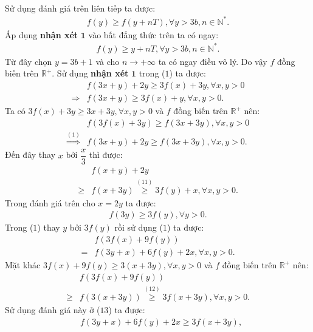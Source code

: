 \begin{multicols}{2}
\begin{align*}
	\end{align*}
	Sử dụng đánh giá trên liên tiếp ta được: 
	\begin{align*}
		f(y) \ge f(y + nT),\forall y > 3b,n \in \mathbb{N^*}.
	\end{align*}
	Áp dụng \textbf{\color{hoccungpi}nhận xét} $\pmb1$ vào bất đẳng thức trên ta có ngay:
	\begin{align*}
		f(y) \ge y + nT,\forall y > 3b,n \in \mathbb{N^*}.
	\end{align*}
	Từ đây chọn $y =3b + 1$ và cho $n \to + \infty$  ta có ngay điều vô lý. Do vậy $f$  đồng biến trên  $\mathbb{R^+}$.
	\vskip 0.1cm
	Sử dụng \textbf{\color{hoccungpi}nhận xét} $\pmb1$ trong ($1$) ta được: 
	\begin{align*}
		&f(3x + y) + 2y \ge 3f(x) + 3y,\forall x,y > 0\\
		\Rightarrow &f(3x + y) \ge 3f(x) + y,\forall x,y > 0. \tag{$11$}
	\end{align*}
	Ta có $3f(x) + 3y \ge 3x + 3y,\forall x,y > 0$  và $f$  đồng biến trên $\mathbb{R^+}$  nên:
	\begin{align*}
		&f(3f(x) + 3y) \ge f(3x + 3y),\forall x,y > 0\\
		\mathop  \Rightarrow \limits^{(1)} &f(3x + y) + 2y \ge f(3x + 3y),\forall x,y > 0.
	\end{align*}
	Đến đây thay $x$ bởi $\dfrac{x}{3}$  thì được: 
	\begin{align*}
		&f(x + y) + 2y \\
		\ge &f(x + 3y)\mathop  \ge \limits^{(11)} 3f(y) + x,\forall x,y > 0.
	\end{align*}
	Trong đánh giá trên cho $x = 2y$  ta được:
	\begin{align*}
		f(3y) \ge 3f(y),\forall y > 0. \tag{$12$}
	\end{align*}
	Trong ($1$) thay  $y$ bởi $3f(y)$  rồi sử dụng ($1$) ta được:   
	\begin{align*}
		&f(3f(x) + 9f(y)) \\
		= &f(3y + x) + 6f(y) + 2x,\forall x,y > 0. \tag{$13$}
	\end{align*}
	Mặt khác $3f(x) + 9f(y) \ge 3(x + 3y),\forall x,y > 0$  và $f$  đồng biến trên $\mathbb{R^+}$   nên: 
	\begin{align*}
		&f(3f(x) + 9f(y)) \\
		\ge & f(3(x + 3y))\mathop  \ge \limits^{(12)} 3f(x + 3y),\forall x,y > 0.
	\end{align*}
	Sử dụng đánh giá này ở ($13$)  ta được:
	\begin{align*}
		&f(3y + x) + 6f(y) + 2x \ge 3f(x + 3y),\\

\end{align*}
\end{multicols}
